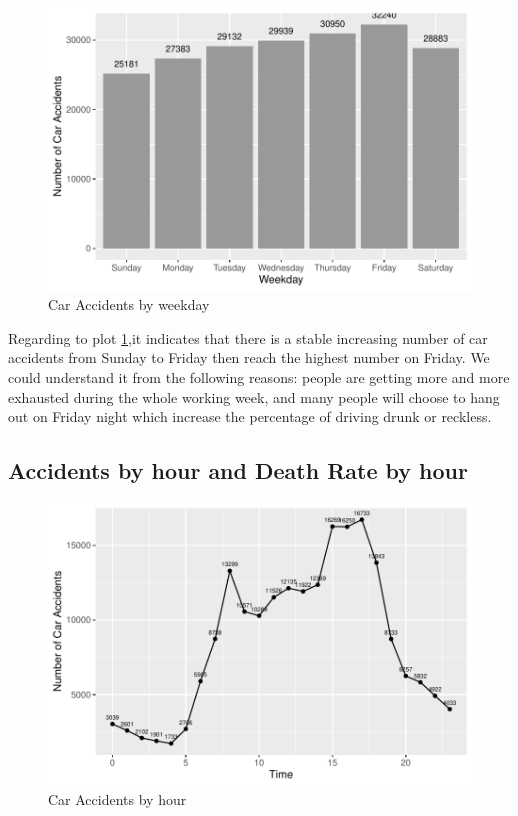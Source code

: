 \documentclass[11pt,a4paper,]{article}
\begin{document}
\begin{figure}
\centering
\includegraphics{Report_files/figure-latex/chen2-1.pdf}
\caption{\label{fig:chen2}Car Accidents by weekday}
\end{figure}

Regarding to plot \ref{fig:chen2},it indicates that there is a stable increasing number of car accidents from Sunday to Friday then reach the highest number on Friday. We could understand it from the following reasons: people are getting more and more exhausted during the whole working week, and many people will choose to hang out on Friday night which increase the percentage of driving drunk or reckless.

\subsection*{Accidents by hour and Death Rate by hour}

\begin{figure}
\centering
\includegraphics{Report_files/figure-latex/chen3-1.pdf}
\caption{\label{fig:chen3}Car Accidents by hour}
\end{figure}
\end{document}
